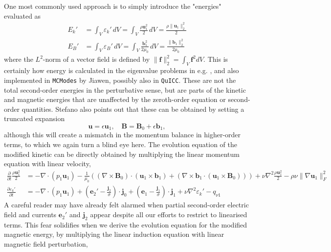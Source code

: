 One most commonly used approach is to simply introduce the "energies" evaluated as
%
\begin{equation}
\begin{aligned}
    E_k' &= \int_V \varepsilon_k' \, dV = \int_V \frac{\rho \mathbf{u}_1^2}{2} \, dV = \frac{\rho \|\mathbf{u}_1\|_2^2}{2} \\ 
    E_B' &= \int_V \varepsilon_B' \, dV = \int_V \frac{\mathbf{b}_1^2}{2\mu_0} \, dV = \frac{\|\mathbf{b}_1\|_2^2}{2\mu_0}
\end{aligned}
\end{equation}
%
where the $L^2$-norm of a vector field is defined by $\|\mathbf{f}\|_2^2 = \int_V \mathbf{f}^2 dV$. This is certainly how energy is calculated in the eigenvalue problems in e.g. \citet{gerick_qg_2021}, and also implemented in \texttt{MCModes} by Jiawen, possibly also in \texttt{QuICC}.
These are not the total second-order energies in the perturbative sense, but are parts of the kinetic and magnetic energies that are unaffected by the zeroth-order equation or second-order quantities. Stefano also points out that these can be obtained by setting a truncated expansion
%
\[
    \mathbf{u} = \epsilon \mathbf{u}_1,\quad \mathbf{B} = \mathbf{B}_0 + \epsilon \mathbf{b}_1,
\]
%
although this will create a mismatch in the momentum balance in higher-order terms, to which we again turn a blind eye here. The evolution equation of the modified kinetic can be directly obtained by multiplying the linear momentum equation with linear velocity,
%
\[
\begin{aligned}
    \frac{\partial}{\partial t} \frac{\rho \mathbf{u}_1^2}{2} &= - \nabla\cdot (p_1 \mathbf{u}_1) - \frac{1}{\mu_0} \left((\nabla\times \mathbf{B}_0)\cdot (\mathbf{u}_1\times \mathbf{b}_1) + (\nabla\times \mathbf{b}_1\cdot (\mathbf{u}_1\times \mathbf{B}_0))\right) + \nu \nabla^2 \frac{\rho \mathbf{u}_1^2}{2} - \rho \nu \|\nabla\mathbf{u}_1\|_F^2 \\ 
    \frac{\partial \varepsilon_k'}{\partial t} &= - \nabla\cdot (p_1 \mathbf{u}_1) + \left(\mathbf{e}_2' - \frac{\mathbf{j}_2}{\sigma}\right)\cdot \mathbf{j}_0 + \left(\mathbf{e}_1 - \frac{\mathbf{j}_1}{\sigma}\right)\cdot \mathbf{j}_1 + \nu \nabla^2 \varepsilon_k' - q_{\nu 1}
\end{aligned}
\]
%
A careful reader may have already felt alarmed when partial second-order electric field and currents $\mathbf{e}_2'$ and $\mathbf{j}_2$ appear despite all our efforts to restrict to linearised terms.
This fear solidifies when we derive the evolution equation for the modified magnetic energy, by multiplying the linear induction equation with linear magnetic field perturbation,
